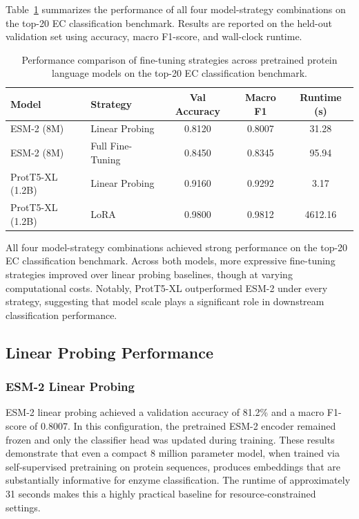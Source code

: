 \documentclass{article}
\begin{document}
Table~\ref{tab:results} summarizes the performance of all four model-strategy combinations on the top-20 EC classification benchmark. Results are reported on the held-out validation set using accuracy, macro F1-score, and wall-clock runtime.

\begin{table}[h]
\centering
\caption{Performance comparison of fine-tuning strategies across pretrained protein language models on the top-20 EC classification benchmark.}
\label{tab:results}
\begin{tabular}{llccc}
\toprule
\textbf{Model} & \textbf{Strategy} & \textbf{Val Accuracy} & \textbf{Macro F1} & \textbf{Runtime (s)} \\
\midrule
ESM-2 (8M)        & Linear Probing   & 0.8120 & 0.8007 & 31.28   \\
ESM-2 (8M)        & Full Fine-Tuning & 0.8450 & 0.8345 & 95.94   \\
ProtT5-XL (1.2B)  & Linear Probing   & 0.9160 & 0.9292 & 3.17    \\
ProtT5-XL (1.2B)  & LoRA             & 0.9800 & 0.9812 & 4612.16 \\
\bottomrule
\end{tabular}
\end{table}

All four model-strategy combinations achieved strong performance on the top-20 EC classification benchmark. Across both models, more expressive fine-tuning strategies improved over linear probing baselines, though at varying computational costs. Notably, ProtT5-XL outperformed ESM-2 under every strategy, suggesting that model scale plays a significant role in downstream classification performance.

\subsection{Linear Probing Performance}

\subsubsection*{ESM-2 Linear Probing}

ESM-2 linear probing achieved a validation accuracy of 81.2\% and a macro F1-score of 0.8007. In this configuration, the pretrained ESM-2 encoder remained frozen and only the classifier head was updated during training. These results demonstrate that even a compact 8 million parameter model, when trained via self-supervised pretraining on protein sequences, produces embeddings that are substantially informative for enzyme classification. The runtime of approximately 31 seconds makes this a highly practical baseline for resource-constrained settings.
\end{document}
